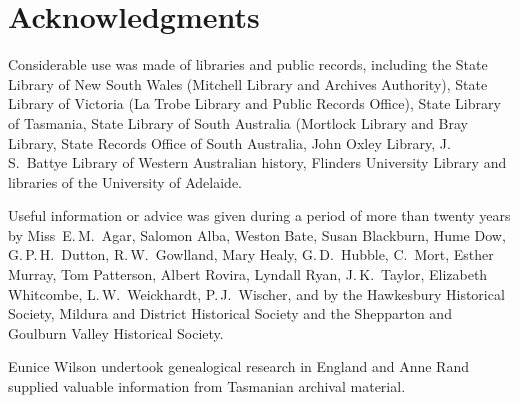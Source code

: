
\chapter{Acknowledgments}
\label{ch:ack}

Considerable use was made of libraries and public records, including
the State Library of New South Wales (Mitchell Library and Archives
Authority), State Library of Victoria (La Trobe Library and Public
Records Office), State Library of Tasmania, State Library of South
Australia (Mortlock Library and Bray Library, State Records Office of
South Australia, John Oxley Library, J.\,S.~Battye Library of Western
Australian history, Flinders University Library and libraries of the
University of Adelaide.

Useful information or advice was given during a period of more than
twenty years by Miss~E.\,M.~Agar, Salomon Alba, Weston Bate, Susan
Blackburn, Hume Dow, G.\,P.\,H.~Dutton, R.\,W.~Gowlland, Mary Healy,
G.\,D.~Hubble, C.~Mort, Esther Murray, Tom Patterson, Albert Rovira,
Lyndall Ryan, J.\,K.~Taylor, Elizabeth Whitcombe, L.\,W.~Weickhardt,
P.\,J.~Wischer, and by the Hawkesbury Historical Society, Mildura and
District Historical Society and the Shepparton and Goulburn Valley
Historical Society.

Eunice Wilson undertook genealogical research in England and Anne Rand
supplied valuable information from Tasmanian archival material.
